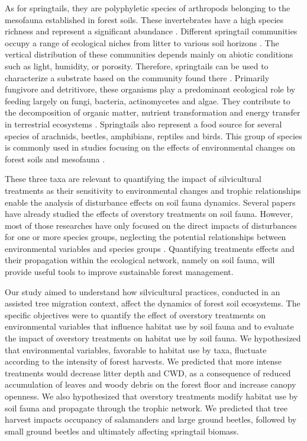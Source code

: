 As for springtails, they are polyphyletic species of arthropods belonging to the mesofauna established in forest soils. 
These invertebrates have a high species richness and represent a significant abundance \citep{rusekBiodiversityCollembolaTheir1998}. 
Different springtail communities occupy a range of ecological niches from litter to various soil horizons \citep{pongeVerticalDistributionCollembola2000}.
The vertical distribution of these communities depends mainly on abiotic conditions such as light, humidity, or porosity. 
Therefore, springtails can be used to characterize a substrate based on the community found there \citep{rusekBiodiversityCollembolaTheir1998}. 
Primarily fungivore and detritivore, these organisms play a predominant ecological role by feeding largely on fungi, bacteria, actinomycetes and algae. 
They contribute to the decomposition of organic matter, nutrient transformation and energy transfer in terrestrial ecosystems \citep{rusekBiodiversityCollembolaTheir1998,Hattenschwiler2005Biodiversitylitter,Cuchta2019importantrole,Marsden2020Howagroforestry}. 
Springtails also represent a food source for several species of arachnids, beetles, amphibians, reptiles and birds. 
This group of species is commonly used in studies focusing on the effects of environmental changes on forest soils and mesofauna \citep{Salmon2008Relationshipssoil,farskaManagementIntensityAffects2014,rousseauWoodyBiomassRemoval2019}.

These three taxa are relevant to quantifying the impact of silvicultural treatments as their sensitivity to environmental changes and trophic relationships enable the analysis of disturbance effects on soil fauna dynamics.
Several papers have already studied the effects of overstory treatments on soil fauna.
However, most of those researches have only focused on the direct impacts of disturbances for one or more species groups, neglecting the potential relationships between environmental variables and species groups \citep{josephIntegratingOccupancyModels2016,Pollierer2021Diversityfunctional,Kudrin2023metaanalysiseffects}. 
Quantifying treatments effects and their propagation within the ecological network, namely on soil fauna, will provide useful tools to improve sustainable forest management.

Our study aimed to understand how silvicultural practices, conducted in an assisted tree migration context, affect the dynamics of forest soil ecosystems. 
The specific objectives were to quantify the effect of overstory treatments on environmental variables that influence habitat use by soil fauna
and to evaluate the impact of overstory treatments on habitat use by soil fauna.
We hypothesized that environmental variables, favorable to habitat use by taxa, fluctuate according to the intensity of forest harvests. 
We predicted that more intense treatments would decrease litter depth and CWD, as a consequence of reduced accumulation of leaves and woody debris on the forest floor and increase canopy openness. 
We also hypothesized that overstory treatments modify habitat use by soil fauna and propagate through the trophic network. 
We predicted that tree harvest impacts occupancy of salamanders and large ground beetles, 
followed by small ground beetles and ultimately affecting springtail biomass. 


